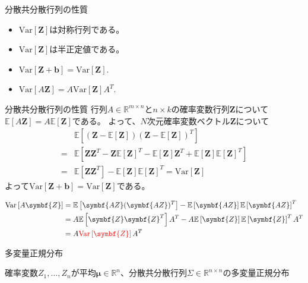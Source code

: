\documentclass[lualatex,handout]{beamer}
\newcommand{\mycolor}[2]{%
  \begingroup
  \colorlet{currentcolor}{.}%
  \color{#1}#2%
  \color{currentcolor}%
  \endgroup
}
\newcommand{\emm}[1]{\mycolor{red}{#1}}
\newcommand{\expt}[1]{\mathbb{E}\left[#1\right]}
\newcommand{\vc}[1]{\mathrm{Var}\left[#1\right]}
\theoremstyle{definition}
\begin{document}
\begin{frame}{分散共分散行列の性質}
\begin{itemize}
\item $\vc{\symbf{Z}}$は対称行列である。
\item $\vc{\symbf{Z}}$は半正定値である。
\item $\vc{\symbf{Z}+\symbf{b}}=\vc{\symbf{Z}}$.
\item $\vc{A\symbf{Z}}=A\vc{\symbf{Z}}A^T$.
\end{itemize}
\end{frame}
\begin{frame}{分散共分散行列の性質}
行列$A\in\mathbb{R}^{m\times n}$と$n\times k$の確率変数行列$\symbf{Z}$について$\expt{A\symbf{Z}}=A\expt{\symbf{Z}}$である。
よって、$N$次元確率変数ベクトル$\symbf{Z}$について
\begin{align*}
&\expt{(\symbf{Z} - \expt{\symbf{Z}})(\symbf{Z} - \expt{\symbf{Z}})^T}\\
=&\expt{\symbf{Z}\symbf{Z}^T - \symbf{Z}\expt{\symbf{Z}}^T - \expt{\symbf{Z}}\symbf{Z}^T + \expt{\symbf{Z}}\expt{\symbf{Z}}^T}\\
=& \expt{\symbf{Z} \symbf{Z}^T} - \expt{\symbf{Z}}\expt{\symbf{Z}}^T
=\vc{\symbf{Z}}
\end{align*}
よって$\vc{\symbf{Z}+\symbf{b}}=\vc{\symbf{Z}}$である。

\vspace{1em}
\begin{align*}
\vc{A\symbf{Z}}&=\expt{\symbf{AZ} (\symbf{AZ})^T} - \expt{\symbf{AZ}}\expt{\symbf{AZ}}^T\\
&=A\expt{\symbf{Z} \symbf{Z}^T}A^T - A\expt{\symbf{Z}}\expt{\symbf{Z}}^TA^T\\
&=A\emm{\vc{\symbf{Z}}}A^T
\end{align*}
\end{frame}

\begin{frame}{多変量正規分布}
\begin{definition}
確率変数$Z_1,\dotsc,Z_n$が平均$\symbf{\mu}\in\mathbb{R}^n$、分散共分散行列$\Sigma\in\mathbb{R}^{n\times n}$の多変量正規分布
\end{definition}
\end{frame}
\end{document}
